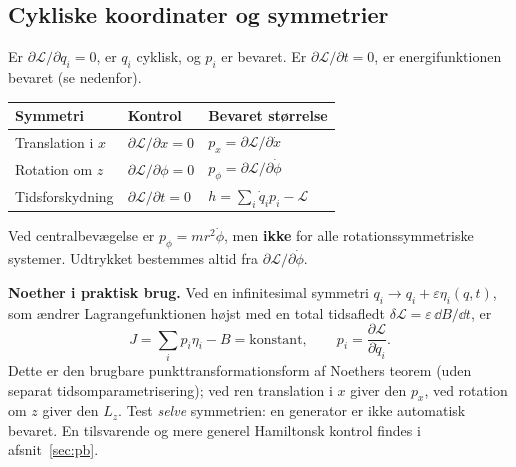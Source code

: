 \subsection{Cykliske koordinater og symmetrier}
Er $\partial\mathcal L/\partial q_i=0$, er $q_i$ cyklisk, og $p_i$ er bevaret. Er $\partial \mathcal L/\partial t=0$, er energifunktionen bevaret (se nedenfor).
\begin{center}\begin{tabular}{>{\raggedright\arraybackslash}p{34mm}p{54mm}p{57mm}}\toprule Symmetri & Kontrol & Bevaret størrelse\\\midrule
Translation i $x$ & $\partial\mathcal L/\partial x=0$ & $p_x=\partial\mathcal L/\partial\dot x$\\
Rotation om $z$ & $\partial\mathcal L/\partial\phi=0$ & $p_\phi=\partial\mathcal L/\partial\dot\phi$\\
Tidsforskydning & $\partial\mathcal L/\partial t=0$ & $h=\sum_i\dot q_i p_i-\mathcal L$\\\bottomrule\end{tabular}\end{center}
\begin{note}Ved centralbevægelse er $p_\phi=mr^2\dot\phi$, men \textbf{ikke} for alle rotationssymmetriske systemer. Udtrykket bestemmes altid fra $\partial\mathcal L/\partial\dot\phi$.\end{note}
\textbf{Noether i praktisk brug.}
Ved en infinitesimal symmetri $q_i\to q_i+\varepsilon \eta_i(q,t)$, som ændrer Lagrangefunktionen højst med en total tidsafledt $\delta\mathcal L=\varepsilon\,\dd B/\dd t$, er
\[
\boxed{J=\sum_i p_i\eta_i-B=\text{konstant}},
\qquad p_i=\frac{\partial\mathcal L}{\partial\dot q_i}.
\]
Dette er den brugbare punkttransformationsform af Noethers teorem (uden separat tidsomparametrisering); ved ren translation i $x$ giver den $p_x$, ved rotation om $z$ giver den $L_z$. Test \emph{selve} symmetrien: en generator er ikke automatisk bevaret. En tilsvarende og mere generel Hamiltonsk kontrol findes i afsnit~\ref{sec:pb}.

